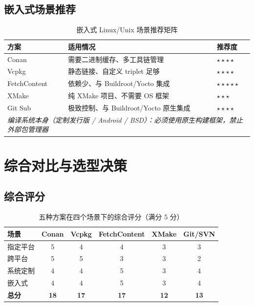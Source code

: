 \documentclass[12pt,a4paper,fontset=fandol]{ctexbook}
\begin{document}
\subsection{嵌入式场景推荐}

\begin{table}[H]
\centering
\caption{嵌入式 Linux/Unix 场景推荐矩阵}
\label{tab:scenario4}
\small
\begin{tabularx}{\textwidth}{l X l}
\toprule
\textbf{方案} & \textbf{适用情况} & \textbf{推荐度} \\
\midrule
Conan      & 需要二进制缓存、多工具链管理       & $\star\star\star\star$ \\
Vcpkg      & 静态链接、自定义 triplet 足够       & $\star\star\star\star$ \\
FetchContent & 依赖少、与 Buildroot/Yocto 集成  & $\star\star\star\star\star$ \\
XMake      & 纯 XMake 项目、不需要 OS 框架      & $\star\star\star$ \\
Git Sub    & 极致控制、与 Buildroot/Yocto 原生集成 & $\star\star\star\star$ \\
\midrule
\multicolumn{3}{l}{\textit{编译系统本身（定制发行版 / Android / BSD）：必须使用原生构建框架，禁止外部包管理器}} \\
\bottomrule
\end{tabularx}
\end{table}

\section{综合对比与选型决策}

\subsection{综合评分}

\begin{table}[H]
\centering
\caption{五种方案在四个场景下的综合评分（满分 5 分）}
\label{tab:overall}
\small
\begin{tabular}{l c c c c c}
\toprule
\textbf{场景} & \textbf{Conan} & \textbf{Vcpkg} & \textbf{Fetch\allowbreak Content} & \textbf{XMake} & \textbf{Git/SVN} \\
\midrule
指定平台     & 5 & 4 & 4 & 3 & 3 \\
跨平台       & 5 & 5 & 3 & 3 & 2 \\
系统定制     & 4 & 4 & 5 & 3 & 4 \\
嵌入式       & 4 & 4 & 5 & 3 & 4 \\
\midrule
\textbf{总分} & \textbf{18} & \textbf{17} & \textbf{17} & \textbf{12} & \textbf{13} \\
\bottomrule
\end{tabular}
\end{table}
\end{document}
